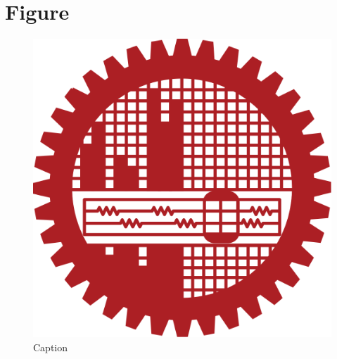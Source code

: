 \documentclass{article}
\begin{document}
\section{Figure}
\begin{figure}
    \centering
    \includegraphics[width=\textwidth]{buet_logo.png}
    \caption{Caption}
    \label{fig:my_label}
\end{figure}
\end{document}
